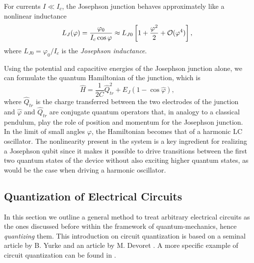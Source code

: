 \smallskip

For currents $I\ll I_c$, the Josephson junction behaves approximately like a nonlinear inductance
%
\begin{equation}
L_J(\varphi) = \frac{\varphi_0}{I_c \cos{\varphi}} \approx L_{J0}\left[1+\frac{\varphi^2}{2}+\begin{mathcal}O\end{mathcal}(\varphi^4)\right],\label{eq:josephson_inductance}
\end{equation}
%
where $L_{J0}=\varphi_0/ I_c$ is the {\it Josephson inductance}. 

\smallskip

Using the potential and capacitive energies of the Josephson junction alone, we can formulate the quantum Hamiltonian of the junction, which is
%
\begin{equation}
\hat{H} = \frac{1}{2C}\hat{Q}^2_{tr}+E_J(1-\cos{\hat{\varphi}}),
\end{equation}
%
where $\hat{Q}_{tr}$ is the charge transferred between the two electrodes of the junction and $\hat{\varphi}$ and $\hat{Q}_{tr}$ are conjugate quantum operators that, in analogy to a classical pendulum, play the role of position and momentum for the Josephson junction. In the limit of small angles $\varphi$, the Hamiltonian becomes that of a harmonic LC oscillator. The nonlinearity present in the system is a key ingredient for realizing a Josephson qubit since it makes it possible to drive transitions between the first two quantum states of the device without also exciting higher quantum states, as would be the case when driving a harmonic oscillator.

\subsection{Quantization of Electrical Circuits}

In this section we outline a general method to treat arbitrary electrical circuits as the ones discussed before within the framework of quantum-mechanics, hence {\it quantizing} them. This introduction on circuit quantization is based on a seminal article by B. Yurke \citep{yurke_quantum_1984} and an article by M. Devoret \cite{devoret_quantum_1995}. A more specific example of circuit quantization can be found in \citep{burkard_multilevel_2004}.

\smallskip

